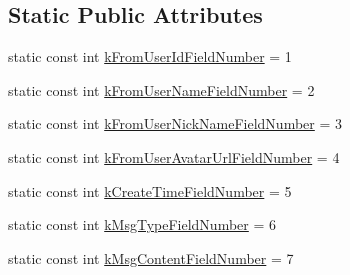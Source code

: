\subsection*{Static Public Attributes}
\begin{DoxyCompactItemize}
\item 
static const int \hyperlink{class_i_m_1_1_base_define_1_1_server_msg_info_a0411a939f129699a54b54e93ac360134}{k\+From\+User\+Id\+Field\+Number} = 1
\item 
static const int \hyperlink{class_i_m_1_1_base_define_1_1_server_msg_info_a287cb96cd10fe53d86334466ca705298}{k\+From\+User\+Name\+Field\+Number} = 2
\item 
static const int \hyperlink{class_i_m_1_1_base_define_1_1_server_msg_info_a75992d44a3be7b6bf2029c70eb441cc6}{k\+From\+User\+Nick\+Name\+Field\+Number} = 3
\item 
static const int \hyperlink{class_i_m_1_1_base_define_1_1_server_msg_info_a5d4f88137fd9883bef8592571e1886ae}{k\+From\+User\+Avatar\+Url\+Field\+Number} = 4
\item 
static const int \hyperlink{class_i_m_1_1_base_define_1_1_server_msg_info_a541d494ffe0d32f801a2eb5eda84b4ea}{k\+Create\+Time\+Field\+Number} = 5
\item 
static const int \hyperlink{class_i_m_1_1_base_define_1_1_server_msg_info_a2a401ece02eba7119dc051679c7c1a1e}{k\+Msg\+Type\+Field\+Number} = 6
\item 
static const int \hyperlink{class_i_m_1_1_base_define_1_1_server_msg_info_a9733a4fe7f638f6ffc8757845bd03dfc}{k\+Msg\+Content\+Field\+Number} = 7
\end{DoxyCompactItemize}
